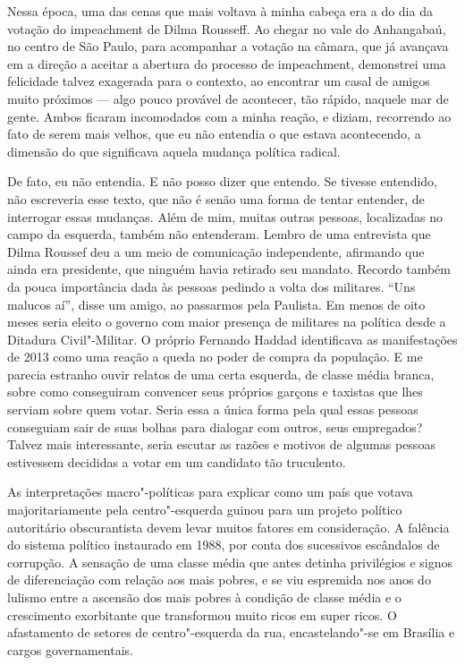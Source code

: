 Nessa época, uma das cenas que mais voltava à minha cabeça era a do dia
da votação do impeachment de Dilma Rousseff. Ao chegar no vale do
Anhangabaú, no centro de São Paulo, para acompanhar a votação na câmara,
que já avançava em a direção a aceitar a abertura do processo de
impeachment, demonstrei uma felicidade talvez exagerada para o contexto,
ao encontrar um casal de amigos muito próximos --- algo pouco provável de
acontecer, tão rápido, naquele mar de gente. Ambos ficaram incomodados
com a minha reação, e diziam, recorrendo ao fato de serem mais velhos,
que eu não entendia o que estava acontecendo, a dimensão do que
significava aquela mudança política radical.

De fato, eu não entendia. E não posso dizer que entendo. Se tivesse
entendido, não escreveria esse texto, que não é senão uma forma de
tentar entender, de interrogar essas mudanças. Além de mim, muitas
outras pessoas, localizadas no campo da esquerda, também não entenderam.
Lembro de uma entrevista que Dilma Roussef deu a um meio de comunicação
independente, afirmando que ainda era presidente, que ninguém havia
retirado seu mandato. Recordo também da pouca importância dada às
pessoas pedindo a volta dos militares. ``Uns malucos aí'', disse um
amigo, ao passarmos pela Paulista. Em menos de oito meses seria eleito o
governo com maior presença de militares na política desde a Ditadura
Civil"-Militar. O próprio Fernando Haddad identificava as manifestações de 2013
como uma reação a queda no poder de compra da população. E me parecia
estranho ouvir relatos de uma certa esquerda, de classe média branca,
sobre como conseguiram convencer seus próprios garçons e taxistas que
lhes serviam sobre quem votar. Seria essa a única forma pela qual essas
pessoas conseguiam sair de suas bolhas para dialogar com outros, seus
empregados? Talvez mais interessante, seria escutar as razões e motivos
de algumas pessoas estivessem decididas a votar em um candidato tão
truculento.

As interpretações macro"-políticas para explicar como um país que votava
majoritariamente pela centro"-esquerda guinou para um projeto político
autoritário obscurantista devem levar muitos fatores em consideração. A
falência do sistema político instaurado em 1988, por conta dos
sucessivos escândalos de corrupção. A sensação de uma classe média que
antes detinha privilégios e signos de diferenciação com relação aos mais
pobres, e se viu espremida nos anos do lulismo entre a ascensão dos mais
pobres à condição de classe média e o crescimento exorbitante que
transformou muito ricos em super ricos. O afastamento de setores de
centro"-esquerda da rua, encastelando"-se em Brasília e cargos
governamentais.

